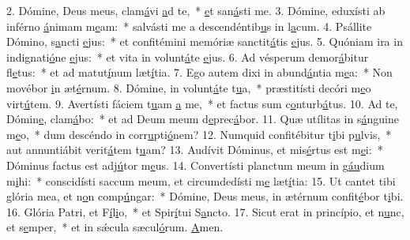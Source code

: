 2. Dómine, Deus meus, clam\uline{á}vi \uline{a}d te,~* \uline{e}t san\uline{á}sti me.
3. Dómine, eduxísti ab inférno \uline{á}nimam m\uline{e}am:~* salvásti me a descendéntib\uline{u}s in l\uline{a}cum.
4. Psállite Dómino, s\uline{a}ncti \uline{e}jus:~* et confitémini memóriæ sanctit\uline{á}tis \uline{e}jus.
5. Quóniam ira in indignati\uline{ó}ne \uline{e}jus:~* et vita in volunt\uline{á}te \uline{e}jus.
6. Ad vésperum demor\uline{á}bitur fl\uline{e}tus:~* et ad matut\uline{í}num læt\uline{í}tia.
7. Ego autem dixi in abund\uline{á}ntia m\uline{e}a:~* Non movébor \uline{i}n æt\uline{é}rnum.
8. Dómine, in volunt\uline{á}te t\uline{u}a,~* præstitísti decóri m\uline{e}o virt\uline{ú}tem.
9. Avertísti fáciem t\uline{u}am \uline{a} me,~* et factus sum c\uline{o}nturb\uline{á}tus.
10. Ad te, Dómin\uline{e}, clam\uline{á}bo:~* et ad Deum meum d\uline{e}prec\uline{á}bor.
11. Quæ utílitas in s\uline{á}nguine m\uline{e}o,~* dum descéndo in corr\uline{u}pti\uline{ó}nem?
12. Numquid confitébitur t\uline{i}bi p\uline{u}lvis,~* aut annuntiábit verit\uline{á}tem t\uline{u}am?
13. Audívit Dóminus, et mis\uline{é}rtus est m\uline{e}i:~* Dóminus factus est adj\uline{ú}tor m\uline{e}us.
14. Convertísti planctum meum in g\uline{áu}dium m\uline{i}hi:~* conscidísti saccum meum, et circumdedísti m\uline{e} læt\uline{í}tia:
15. Ut cantet tibi glória mea, et n\uline{o}n comp\uline{ú}ngar:~* Dómine, Deus meus, in ætérnum confit\uline{é}bor t\uline{i}bi.
16. Glória Patri, et F\uline{í}l\uline{i}o,~* et Spir\uline{í}tui S\uline{a}ncto.
17. Sicut erat in princípio, et n\uline{u}nc, et s\uline{e}mper,~* et in sǽcula sæcul\uline{ó}rum. \uline{A}men.
